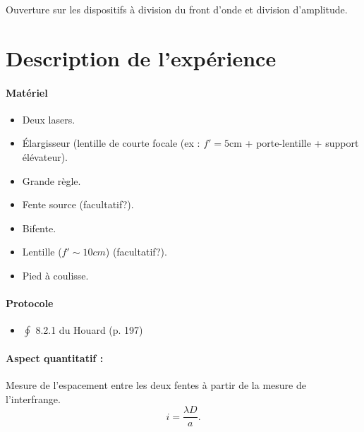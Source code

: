 \documentclass[11pt]{report}
\numberwithin{figure}{section}
\numberwithin{equation}{section}
\numberwithin{table}{section}
\newcommand{\1}{\boldsymbol{1}}
\begin{document}
Ouverture sur les dispositifs à division du front d'onde et division d'amplitude.




\section*{Description de l'expérience}



\begin{tcolorbox}[breakable, enhanced, colback=red!2!white,colframe=mycolor!85!black,title=\textbf{\textbf{Expérience}}]
\paragraph*{Matériel}
\begin{itemize}
\item Deux lasers.
\item \'Elargisseur (lentille de courte focale (ex : $f' = 5$cm + porte-lentille + support élévateur). 
\item Grande règle.
\item Fente source (facultatif?).
\item Bifente.
\item Lentille ($f' \sim 10 cm$) (facultatif?).
\item Pied à coulisse.
\end{itemize}

\paragraph*{Protocole } 

\begin{itemize}[label=$\triangleright$]
		\item $\oint$ 8.2.1 du Houard (p. 197)
\end{itemize}

\paragraph*{Aspect quantitatif :} Mesure de l'espacement entre les deux fentes à partir de la mesure de l'interfrange. 
\begin{equation} \nonumber
i = \frac{\lambda D}{a}.
\end{equation}


\end{tcolorbox}
\end{document}
